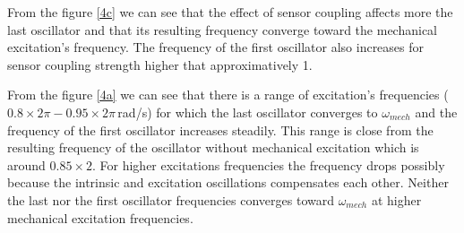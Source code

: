 \documentclass[a4paper]{scrartcl}
\begin{document}
From the figure \ref{4c} we can see that the effect of sensor coupling affects more the last oscillator and that its resulting frequency converge toward the mechanical excitation's frequency. The frequency of the first oscillator also increases for sensor coupling strength higher that approximatively 1.

From the figure \ref{4a} we can see that there is a range of excitation's frequencies ($0.8\times2\pi-0.95\times2\pi$\,rad/s) for which the last oscillator converges to $\omega_{mech}$ and the frequency of the first oscillator increases steadily. This range is close from the resulting frequency of the oscillator without mechanical excitation which is around $0.85\times2$. For higher excitations frequencies the frequency drops possibly because the intrinsic and excitation oscillations compensates each other. Neither the last nor the first oscillator frequencies converges toward $\omega_{mech}$ at higher mechanical excitation frequencies.
\newpage
\end{document}
